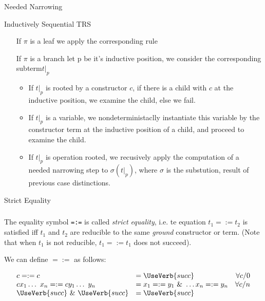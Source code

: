\documentclass{beamer}
\begin{document}
\begin{section}{Needed Narrowing}
\begin{subsection}{Inductively Sequential TRS}
\begin{frame}
\end{frame}

\begin{frame}
  \begin{itemize}
    \setlength{\itemindent}{2cm}
\item[If $\pi$ is a leaf] we apply the corresponding rule
\item[If $\pi$ is a branch] let p be it's inductive position, we consider the corresponding subterm$t|_p$
  \begin{itemize}
  \item If $t|_p$ is rooted by a constructor $c$, if there is a child  with $c$ at the inductive position, we examine the child, else we fail.

  \item If $t|_p$ is a variable, we nondeterministaclly instantiate this variable by the constructor term at the inductive position of a child, and proceed to examine the child.

  \item If $t|_p$ is operation rooted, we recusively apply the computation of a needed narrowing step to $\sigma(t|_p)$, where $\sigma$ is the substution, result of previous case distinctions.
  \end{itemize}
\end{itemize}

\end{frame}
\end{subsection}
\begin{subsection}{Strict Equality}
\begin{frame}[fragile]
\frametitle{\subsecname}
    The equality symbol \verb|=:=| is called \textit{strict equality}, i.e. te equation $t_1 =:= t_2$ is satisfied iff $t_1$ and $t_2$ are reducible to the same \textit{ground} constructor or term. (Note that when $t_1$ is not reducible, $t_1 =:= t_1$ does not succeed).

    We can define $=:=$ as follows:

    \[
    \begin{array}{llr}
    
      c =:= c &= \UseVerb{succ} &\forall  c/0\\
      c x_1 \ldots ~ x_n =:= c y_1 \ldots ~ y_n &= x_1 =:= y_1 ~\&~ \ldots x_n =:= y_n &\forall c/n \\
      \UseVerb{succ}~ \&~ \UseVerb{succ} &= \UseVerb{succ}
    \end{array}
    \]
\end{frame}


\end{subsection}
\end{section}
\end{document}
